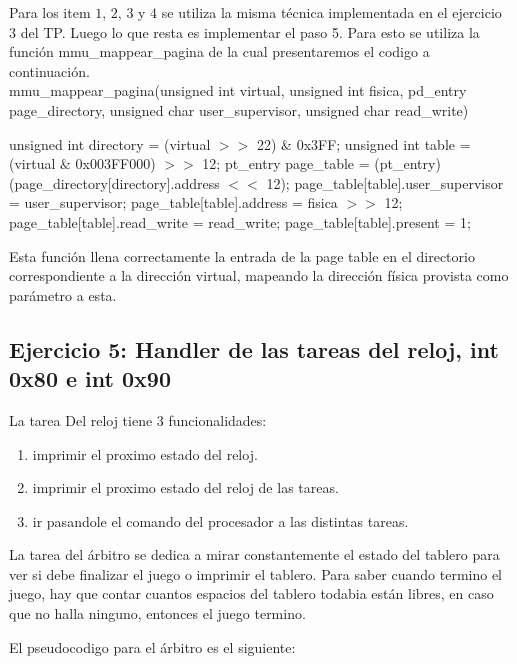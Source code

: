 \documentclass[a4paper,10pt,twoside]{article}
\newenvironment{pseudocodigo}
    {\vspace{0.5em} \begin{algorithmic}}
    {\end{algorithmic} \vspace{0.5em}}
\begin{document}
Para los item $1$, $2$, $3$ y $4$ se utiliza la misma técnica implementada en el ejercicio $3$ del TP.
Luego lo que resta es implementar el paso 5. Para esto se utiliza la función mmu\_mappear\_pagina de la cual presentaremos el codigo a continuación.\\

mmu\_mappear\_pagina(unsigned int virtual, unsigned int fisica, pd\_entry\* page\_directory, unsigned char user\_supervisor, unsigned char read\_write)
\begin{pseudocodigo}
  \STATE unsigned int directory = (virtual $>>$ 22) $\&$ 0x3FF;
  \STATE unsigned int table = (virtual $\&$ 0x003FF000) $>>$ 12;
  \STATE 
  \STATE pt\_entry\* page\_table = (pt\_entry\*) (page\_directory[directory].address $<<$ 12);
  \STATE 
  \STATE page\_table[table].user\_supervisor = user\_supervisor;
  \STATE page\_table[table].address = fisica $>>$ 12;
  \STATE page\_table[table].read\_write = read\_write;
  \STATE page\_table[table].present = 1;
\end{pseudocodigo}

Esta función llena correctamente la entrada de la page table en el directorio correspondiente a la dirección virtual, mapeando la dirección física provista como parámetro a esta.\\

\subsection{Ejercicio 5: Handler de las tareas del reloj, int 0x80 e int 0x90}

La tarea Del reloj tiene 3 funcionalidades:

\begin{enumerate}
 \item imprimir el proximo estado del reloj.
 \item imprimir el proximo estado del reloj de las tareas.
 \item ir pasandole el comando del procesador a las distintas tareas.
\end{enumerate}


La tarea del árbitro se dedica a mirar constantemente el estado del tablero para ver si debe finalizar el juego o imprimir el tablero.
Para saber cuando termino el juego, hay que contar cuantos espacios del tablero todabia están libres, en caso que no halla ninguno, entonces el juego termino.

El pseudocodigo para el árbitro es el siguiente:\\
\end{document}

